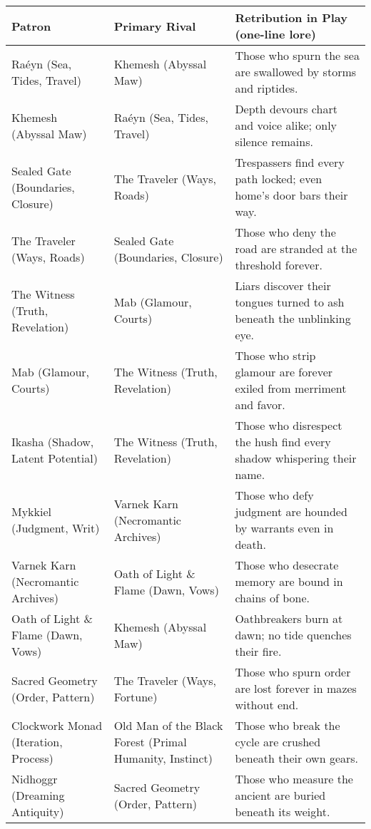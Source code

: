 \begin{table}[h!]
  \centering
  \renewcommand{\arraystretch}{1.15}
  \begin{tabular}{@{}p{3.4cm}p{3.4cm}p{8.2cm}@{}}
    \toprule
    \textbf{Patron} & \textbf{Primary Rival} & \textbf{Retribution in Play (one-line lore)} \\
    \midrule
    Raéyn (Sea, Tides, Travel) & Khemesh (Abyssal Maw) & Those who spurn the sea are swallowed by storms and riptides. \\
    Khemesh (Abyssal Maw) & Raéyn (Sea, Tides, Travel) & Depth devours chart and voice alike; only silence remains. \\
    Sealed Gate (Boundaries, Closure) & The Traveler (Ways, Roads) & Trespassers find every path locked; even home’s door bars their way. \\
    The Traveler (Ways, Roads) & Sealed Gate (Boundaries, Closure) & Those who deny the road are stranded at the threshold forever. \\
    The Witness (Truth, Revelation) & Mab (Glamour, Courts) & Liars discover their tongues turned to ash beneath the unblinking eye. \\
    Mab (Glamour, Courts) & The Witness (Truth, Revelation) & Those who strip glamour are forever exiled from merriment and favor. \\
    Ikasha (Shadow, Latent Potential) & The Witness (Truth, Revelation) & Those who disrespect the hush find every shadow whispering their name. \\
    Mykkiel (Judgment, Writ) & Varnek Karn (Necromantic Archives) & Those who defy judgment are hounded by warrants even in death. \\
    Varnek Karn (Necromantic Archives) & Oath of Light \& Flame (Dawn, Vows) & Those who desecrate memory are bound in chains of bone. \\
    Oath of Light \& Flame (Dawn, Vows) & Khemesh (Abyssal Maw) & Oathbreakers burn at dawn; no tide quenches their fire. \\
    Sacred Geometry (Order, Pattern) & The Traveler (Ways, Fortune) & Those who spurn order are lost forever in mazes without end. \\
    Clockwork Monad (Iteration, Process) & Old Man of the Black Forest (Primal Humanity, Instinct) & Those who break the cycle are crushed beneath their own gears. \\
    Nidhoggr (Dreaming Antiquity) & Sacred Geometry (Order, Pattern) & Those who measure the ancient are buried beneath its weight. \\

\end{tabular}
\end{table}

